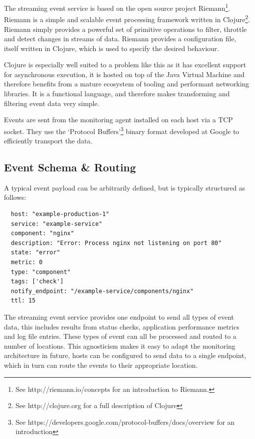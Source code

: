 \documentclass{cshonours}
\begin{document}
The streaming event service is based on the open source project
Riemann\footnote{See http://riemann.io/concepts for an introduction to
Riemann.}. Riemann is a simple and scalable event processing framework written in Clojure\footnote{See http://clojure.org for a full description of Clojure}. Riemann simply provides a powerful set of primitive operations to filter, throttle and detect changes in streams of data. Riemann provides a configuration file, itself written in Clojure, which is used to specify the desired behaviour.

Clojure is especially well suited to a problem like this as it has excellent support for asynchronous execution, it is hosted on top of the Java Virtual Machine and therefore benefits from a mature ecosystem of tooling and performant networking libraries. It is a functional language, and therefore makes transforming and filtering event data very simple.

Events are sent from the monitoring agent installed on each host via a TCP
socket. They use the `Protocol Buffers'\footnote{See https://developers.google.com/protocol-buffers/docs/overview for an introduction} binary format developed at Google to efficiently transport the data.

\subsection{Event Schema \& Routing}

A typical event payload can be arbitrarily defined, but is typically structured as follows:

\begin{verbatim}
  host: "example-production-1"
  service: "example-service"
  component: "nginx"
  description: "Error: Process nginx not listening on port 80"
  state: "error"
  metric: 0
  type: "component"
  tags: ['check']
  notify_endpoint: "/example-service/components/nginx"
  ttl: 15
\end{verbatim}

The streaming event service provides one endpoint to send all types of event data, this includes results from status checks, application performance metrics and log file entries. These types of event can all be processed and routed to a number of locations. This agnosticism makes it easy to adapt the monitoring architecture in future, hosts can be configured to send data to a single endpoint, which in turn can route the events to their appropriate location.
\end{document}
